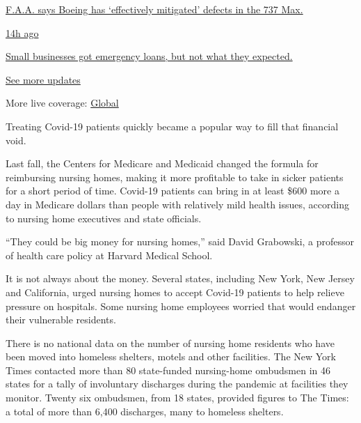 \href{https://www.nytimes3xbfgragh.onion/live/2020/08/03/business/stock-market-today-coronavirus?action=click\&pgtype=Article\&state=default\&region=MAIN_CONTENT_1\&context=storylines_live_updates\#faa-says-boeing-has-effectively-mitigated-defects-in-the-737-max}{F.A.A.
says Boeing has `effectively mitigated' defects in the 737 Max.}

\href{https://www.nytimes3xbfgragh.onion/live/2020/08/03/business/stock-market-today-coronavirus?action=click\&pgtype=Article\&state=default\&region=MAIN_CONTENT_1\&context=storylines_live_updates\#small-businesses-got-emergency-loans-but-not-what-they-expected}{14h
ago}

\href{https://www.nytimes3xbfgragh.onion/live/2020/08/03/business/stock-market-today-coronavirus?action=click\&pgtype=Article\&state=default\&region=MAIN_CONTENT_1\&context=storylines_live_updates\#small-businesses-got-emergency-loans-but-not-what-they-expected}{Small
businesses got emergency loans, but not what they expected.}

\href{https://www.nytimes3xbfgragh.onion/live/2020/08/03/business/stock-market-today-coronavirus?action=click\&pgtype=Article\&state=default\&region=MAIN_CONTENT_1\&context=storylines_live_updates}{See
more updates}

More live coverage:
\href{https://www.nytimes3xbfgragh.onion/2020/08/03/world/coronavirus-covid-19.html?action=click\&pgtype=Article\&state=default\&region=MAIN_CONTENT_1\&context=storylines_live_updates}{Global}

Treating Covid-19 patients quickly became a popular way to fill that
financial void.

Last fall, the Centers for Medicare and Medicaid changed the formula for
reimbursing nursing homes, making it more profitable to take in sicker
patients for a short period of time. Covid-19 patients can bring in at
least \$600 more a day in Medicare dollars than people with relatively
mild health issues, according to nursing home executives and state
officials.

``They could be big money for nursing homes,'' said David Grabowski, a
professor of health care policy at Harvard Medical School.

It is not always about the money. Several states, including New York,
New Jersey and California, urged nursing homes to accept Covid-19
patients to help relieve pressure on hospitals. Some nursing home
employees worried that would endanger their vulnerable residents.

There is no national data on the number of nursing home residents who
have been moved into homeless shelters, motels and other facilities. The
New York Times contacted more than 80 state-funded nursing-home
ombudsmen in 46 states for a tally of involuntary discharges during the
pandemic at facilities they monitor. Twenty six ombudsmen, from 18
states, provided figures to The Times: a total of more than 6,400
discharges, many to homeless shelters.

